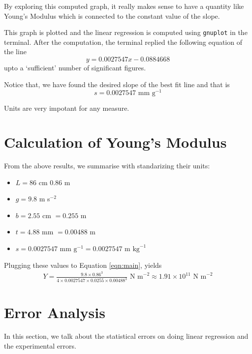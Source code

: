 \documentclass[11pt]{scrartcl}
\begin{document}
By exploring this computed graph, it really makes sense to have a quantity like Young's Modulus which is connected to the constant value of the slope.

This graph is plotted and the linear regression is computed using \texttt{gnuplot} in the terminal. After the computation, the terminal replied the following equation of the line 
\begin{equation}
    \boxed{y = 0.0027547x - 0.0884668}
\end{equation}
upto a `sufficient' number of significant figures.

Notice that, we have found the desired slope of the best fit line and that is \[s = 0.0027547 \text{ mm g}^{-1}\]

\begin{remark}
    Units are very impotant for any measure.
\end{remark}

\newpage

\section{Calculation of Young's Modulus}
From the above results, we summarise with standarizing their units: 
\begin{itemize}
    \item \(L = 86\) cm \(0.86\) m
    \item \(g = 9.8\) m s\(^{-2}\)
    \item \(b = 2.55\) cm \(= 0.255\) m
    \item \(t = 4.88\) mm \(= 0.00488\) m
    \item \(s = 0.0027547 \text{ mm g}^{-1} = 0.0027547 \text{ m kg}^{-1}\) 
\end{itemize}
Plugging these values to Equation \ref{eqn:main}, yields 
\begin{align}
    Y = \frac{9.8 \times 0.86^3}{4 \times 0.0027547 \times 0.0255 \times 0.00488^3} \text{ N m}^{-2} \approx \boxed{1.91 \times 10^{11} \text{ N m}^{-2}}
    \label{eqn:young}
\end{align}

\section{Error Analysis}
In this section, we talk about the statistical errors on doing linear regression and the experimental errors.
\end{document}
